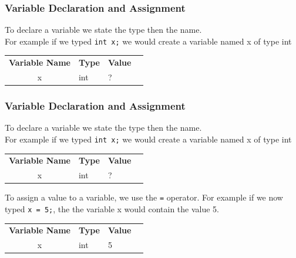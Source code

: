 \documentclass{if-beamer}
\begin{document}
\begin{frame}
\frametitle{Variable Declaration and Assignment}
To declare a variable we state the type then the name. \\
For example if we typed \texttt{int x;} we would create a variable named x of type int 
\begin{table}
\begin{tabular}{cl l l}
\textbf{Variable Name} & \textbf{Type} & \textbf{Value}\\
x & int & ? \\
\end{tabular}
\end{table}
\end{frame}

\begin{frame}
\frametitle{Variable Declaration and Assignment}
To declare a variable we state the type then the name. \\
For example if we typed \texttt{int x;} we would create a variable named x of type int 
\begin{table}
	\begin{tabular}{cl l l}
		\textbf{Variable Name} & \textbf{Type} & \textbf{Value}\\
		x & int & ? \\
	\end{tabular}
\end{table}

To assign a value to a variable, we use the \texttt{=} operator. For example if we now typed \texttt{x = 5;}, the the variable x would contain the value 5.
\begin{table}
	\begin{tabular}{cl l l}
		\textbf{Variable Name} & \textbf{Type} & \textbf{Value}\\
		x & int & 5 \\
	\end{tabular}
\end{table}
\end{frame}
\end{document}
